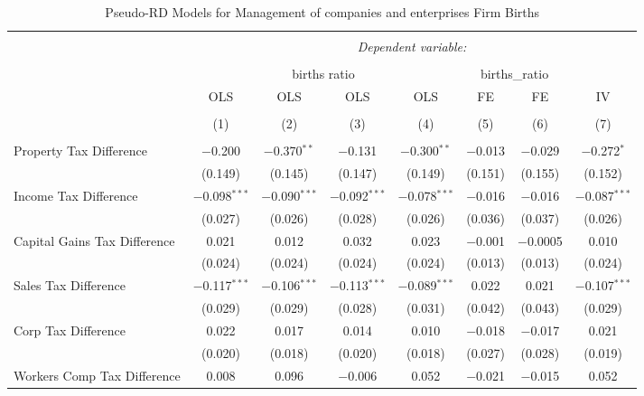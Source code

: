 
\begin{table}[!htbp] \centering 
  \caption{Pseudo-RD Models for  Management of companies and enterprises Firm Births} 
  \label{} 
\begin{tabular}{@{\extracolsep{5pt}}lccccccc} 
\\[-1.8ex]\hline 
\hline \\[-1.8ex] 
 & \multicolumn{7}{c}{\textit{Dependent variable:}} \\ 
\cline{2-8} 
\\[-1.8ex] & \multicolumn{4}{c}{births ratio} & \multicolumn{2}{c}{births\_ratio} &   \\ 
 & OLS & OLS & OLS & OLS & FE & FE & IV \\ 
\\[-1.8ex] & (1) & (2) & (3) & (4) & (5) & (6) & (7)\\ 
\hline \\[-1.8ex] 
 Property Tax Difference & $-$0.200 & $-$0.370$^{**}$ & $-$0.131 & $-$0.300$^{**}$ & $-$0.013 & $-$0.029 & $-$0.272$^{*}$ \\ 
  & (0.149) & (0.145) & (0.147) & (0.149) & (0.151) & (0.155) & (0.152) \\ 
  Income Tax Difference & $-$0.098$^{***}$ & $-$0.090$^{***}$ & $-$0.092$^{***}$ & $-$0.078$^{***}$ & $-$0.016 & $-$0.016 & $-$0.087$^{***}$ \\ 
  & (0.027) & (0.026) & (0.028) & (0.026) & (0.036) & (0.037) & (0.026) \\ 
  Capital Gains Tax Difference & 0.021 & 0.012 & 0.032 & 0.023 & $-$0.001 & $-$0.0005 & 0.010 \\ 
  & (0.024) & (0.024) & (0.024) & (0.024) & (0.013) & (0.013) & (0.024) \\ 
  Sales Tax Difference & $-$0.117$^{***}$ & $-$0.106$^{***}$ & $-$0.113$^{***}$ & $-$0.089$^{***}$ & 0.022 & 0.021 & $-$0.107$^{***}$ \\ 
  & (0.029) & (0.029) & (0.028) & (0.031) & (0.042) & (0.043) & (0.029) \\ 
  Corp Tax Difference & 0.022 & 0.017 & 0.014 & 0.010 & $-$0.018 & $-$0.017 & 0.021 \\ 
  & (0.020) & (0.018) & (0.020) & (0.018) & (0.027) & (0.028) & (0.019) \\ 
  Workers Comp Tax Difference & 0.008 & 0.096 & $-$0.006 & 0.052 & $-$0.021 & $-$0.015 & 0.052 \\ 

\end{tabular}
\end{table}

